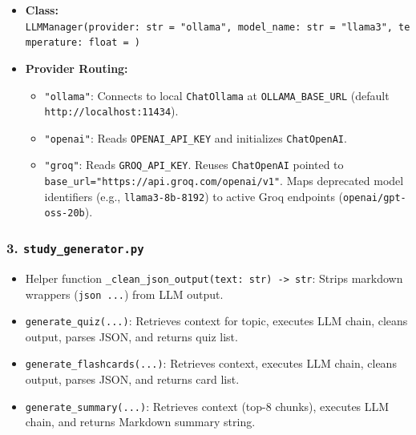 \documentclass[
]{article}
\providecommand{\tightlist}{%
  \setlength{\itemsep}{0pt}\setlength{\parskip}{0pt}}
\begin{document}
\begin{itemize}
\tightlist
\item
  \textbf{Class:}
  \texttt{LLMManager(\allowbreak provider:\ \allowbreak str\ \allowbreak =\allowbreak \ \allowbreak "ollama",\allowbreak \ \allowbreak model\_\allowbreak name:\ \allowbreak str\ \allowbreak =\allowbreak \ \allowbreak "llama3",\allowbreak \ \allowbreak temperature:\ \allowbreak float\ \allowbreak =\allowbreak \ )\allowbreak }
\item
  \textbf{Provider Routing:}

  \begin{itemize}
  \tightlist
  \item
    \texttt{"ollama"}: Connects to local \texttt{ChatOllama} at
    \texttt{OLLAMA\_\allowbreak BASE\_\allowbreak URL} (default
    \texttt{http:/\allowbreak /\allowbreak localhost:11434}).
  \item
    \texttt{"openai"}: Reads \texttt{OPENAI\_\allowbreak API\_\allowbreak KEY} and initializes
    \texttt{ChatOpenAI}.
  \item
    \texttt{"groq"}: Reads \texttt{GROQ\_\allowbreak API\_\allowbreak KEY}. Reuses
    \texttt{ChatOpenAI} pointed to
    \texttt{base\_\allowbreak url=\allowbreak "https:/\allowbreak /\allowbreak api.\allowbreak groq.\allowbreak com/\allowbreak openai/\allowbreak v1"}. Maps deprecated
    model identifiers (e.g., \texttt{llama3-8b-8192}) to active Groq
    endpoints (\texttt{openai/\allowbreak gpt-oss-20b}).
  \end{itemize}
\end{itemize}

\subsubsection{\texorpdfstring{3.
\texttt{study\_\allowbreak generator.\allowbreak py}}{3. study\_generator.py}}\label{study_generator.py}

\begin{itemize}
\tightlist
\item
  Helper function
  \texttt{\_\allowbreak clean\_\allowbreak json\_\allowbreak output(\allowbreak text:\ \allowbreak str)\allowbreak \ \allowbreak -\textgreater{}\allowbreak \ \allowbreak str}:
  Strips markdown wrappers (\texttt{json\ \allowbreak .\allowbreak .\allowbreak .}) from LLM output.
\item
  \texttt{generate\_\allowbreak quiz(\allowbreak .\allowbreak .\allowbreak .)\allowbreak }: Retrieves context for topic, executes
  LLM chain, cleans output, parses JSON, and returns quiz list.
\item
  \texttt{generate\_\allowbreak flashcards(\allowbreak .\allowbreak .\allowbreak .)\allowbreak }: Retrieves context, executes LLM
  chain, cleans output, parses JSON, and returns card list.
\item
  \texttt{generate\_\allowbreak summary(\allowbreak .\allowbreak .\allowbreak .)\allowbreak }: Retrieves context (top-8 chunks),
  executes LLM chain, and returns Markdown summary string.
\end{itemize}
\end{document}
